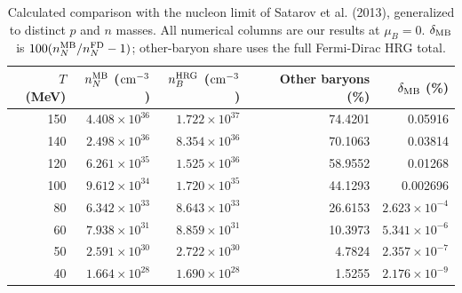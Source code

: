 \begin{table}[t]\centering\small
\caption{Calculated comparison with the nucleon limit of Satarov et al. (2013), generalized to distinct $p$ and $n$ masses. All numerical columns are our results at $\mu_B=0$. $\delta_{\rm MB}$ is $100(n_N^{\rm MB}/n_N^{\rm FD}-1)$; other-baryon share uses the full Fermi-Dirac HRG total.}\label{tab:nucleoncontrast}
\setlength{\tabcolsep}{8pt}\renewcommand{\arraystretch}{1.14}
\begin{tabular}{rrrrr}\toprule
$T$ (MeV) & $n_N^{\rm MB}$ (${\rm cm^{-3}}$) & $n_B^{\rm HRG}$ (${\rm cm^{-3}}$) & Other baryons (\%) & $\delta_{\rm MB}$ (\%) \\ \midrule
150 & $4.408\times10^{36}$ & $1.722\times10^{37}$ & 74.4201 & 0.05916 \\
140 & $2.498\times10^{36}$ & $8.354\times10^{36}$ & 70.1063 & 0.03814 \\
120 & $6.261\times10^{35}$ & $1.525\times10^{36}$ & 58.9552 & 0.01268 \\
100 & $9.612\times10^{34}$ & $1.720\times10^{35}$ & 44.1293 & 0.002696 \\
80 & $6.342\times10^{33}$ & $8.643\times10^{33}$ & 26.6153 & $2.623\times10^{-4}$ \\
60 & $7.938\times10^{31}$ & $8.859\times10^{31}$ & 10.3973 & $5.341\times10^{-6}$ \\
50 & $2.591\times10^{30}$ & $2.722\times10^{30}$ & 4.7824 & $2.357\times10^{-7}$ \\
40 & $1.664\times10^{28}$ & $1.690\times10^{28}$ & 1.5255 & $2.176\times10^{-9}$ \\
\bottomrule\end{tabular}\end{table}
